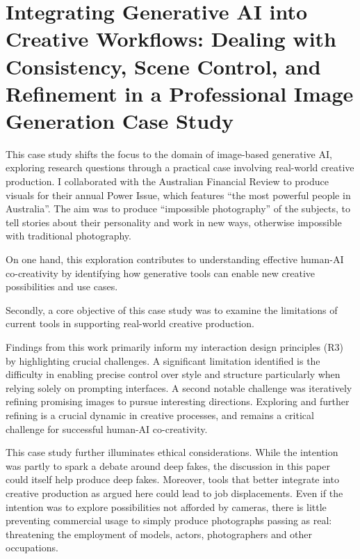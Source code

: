 \chapter{Integrating Generative AI into Creative Workflows: Dealing with Consistency, Scene Control, and Refinement in a Professional Image Generation Case Study} \label{c:tc6} 

This case study shifts the focus to the domain of image-based generative AI, exploring research questions through a practical case involving real-world creative production. I collaborated with the Australian Financial Review to produce visuals for their annual Power Issue, which features “the most powerful people in Australia”. The aim was to produce “impossible photography” of the subjects, to tell stories about their personality and work in new ways, otherwise impossible with traditional photography. 

On one hand, this exploration contributes to understanding effective human-AI co-creativity by identifying how generative tools can enable new creative possibilities and use cases.

Secondly, a core objective of this case study was to examine the limitations of current tools in supporting real-world creative production. 

Findings from this work primarily inform my interaction design principles (R3) by highlighting crucial challenges. A significant limitation identified is the difficulty in enabling precise control over style and structure particularly when relying solely on prompting interfaces. A second notable challenge was iteratively refining promising images to pursue interesting directions. Exploring and further refining is a crucial dynamic in creative processes, and remains a critical challenge for successful human-AI co-creativity. 

This case study further illuminates ethical considerations. While the intention was partly to spark a debate around deep fakes, the discussion in this paper could itself help produce deep fakes. Moreover, tools that better integrate into creative production as argued here could lead to job displacements. Even if the intention was to explore possibilities not afforded by cameras, there is little preventing commercial usage to simply produce photographs passing as real: threatening the employment of models, actors, photographers and other occupations. 




